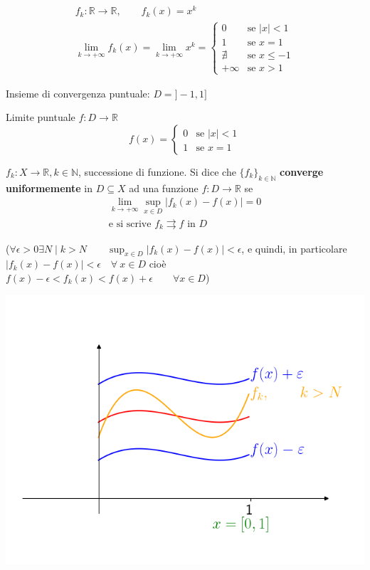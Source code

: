 \begin{exbar}
	\begin{gather*}
	f_k: \mathbb{R} \rightarrow \mathbb{R}, \qquad f_k(x) = x^k
	\\
	\lim_{k \rightarrow + \infty} f_k(x) = \lim_{k \rightarrow + \infty} x^k =
	\begin{cases}
		0 & \text{se } |x|<1
		\\
		1 & \text{se } x=1 
		\\
		\nexists & \text{se } x \leq -1
		\\
		+\infty & \text{se } x >1
	\end{cases}
	\end{gather*}
	
	Insieme di convergenza puntuale: $D = ]-1,1]$
	
	Limite puntuale $f:D \rightarrow \mathbb{R}$		
	\begin{equation*} f(x) = \begin{cases}
		0 & \text{se } |x|<1
		\\
		1 & \text{se } x=1
	\end{cases}
	\end{equation*}	
\end{exbar}


\begin{definition}
	$f_k:X \rightarrow \mathbb{R}, k \in \mathbb{N}$, successione di funzione. Si dice che $\{ f_k \}_{k \in \mathbb{N} }$ \textbf{converge uniformemente} in $D \subseteq X$ ad una funzione $f: D \rightarrow \mathbb{R}$ se 
	\begin{gather*}
		\lim_{k \rightarrow +\infty} \sup_{x \in D} |f_k(x) - f(x)| = 0 
		\\
		\text{e si scrive } f_k \rightrightarrows f \text{ in } D
	\end{gather*}
	
	($\forall \epsilon >0 \exists N \; \big| \; k >N \qquad \sup_{x \in D} |f_k(x)-f(x)| < \epsilon$, e quindi, in particolare $|f_k(x) - f(x)| < \epsilon  \quad \forall \ x \in D$ cioè $f(x) - \epsilon <f_k(x) < f(x) + \epsilon \qquad \forall x \in D$)
	
	\begin{center}
		\includegraphics[width=0.7\linewidth]{spazi_metrici_e_normati/pag184}
		\label{fig:pag184}
	\end{center}
\end{definition}



